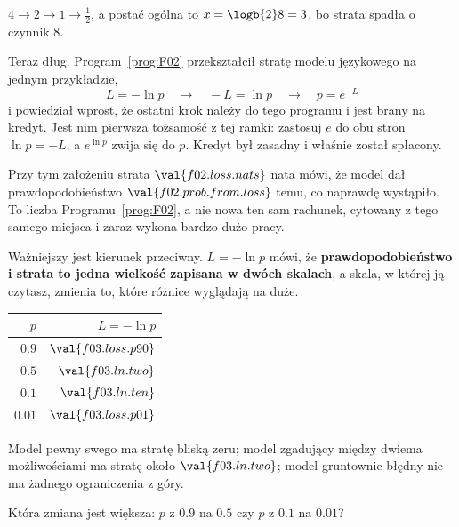 \begin{fr}
$4 \to 2 \to 1 \to \tfrac{1}{2}$, a postać ogólna to $x = \logb{2} 8 = 3$, bo
strata spadła o czynnik $8$.

Teraz dług. Program~\ref{prog:F02} przekształcił stratę modelu językowego na
jednym przykładzie,
\[ L = -\ln p \quad\longrightarrow\quad -L = \ln p
   \quad\longrightarrow\quad p = e^{-L} \]
i powiedział wprost, że ostatni krok należy do tego programu i jest brany na
kredyt. Jest nim pierwsza tożsamość z tej ramki: zastosuj $e$ do obu stron
$\ln p = -L$, a $e^{\ln p}$ zwija się do $p$. Kredyt był zasadny i właśnie
został spłacony.

Przy tym założeniu strata $\val{f02.loss.nats}$ nata mówi, że model dał
prawdopodobieństwo $\val{f02.prob.from.loss}$ temu, co naprawdę wystąpiło. To
liczba Programu~\ref{prog:F02}, a nie nowa \dash{} ten sam rachunek, cytowany z
tego samego miejsca \dash{} i zaraz wykona bardzo dużo pracy.
\end{fr}

\begin{fr}
Ważniejszy jest kierunek przeciwny. $L = -\ln p$ mówi, że
\textbf{prawdopodobieństwo i strata to jedna wielkość zapisana w dwóch
skalach}, a skala, w której ją czytasz, zmienia to, które różnice wyglądają na
duże.

\begin{center}
\begin{tabular}{rr}
\toprule
$p$ & $L = -\ln p$ \\
\midrule
$\num{0.9}$ & $\val{f03.loss.p90}$ \\
$\num{0.5}$ & $\val{f03.ln.two}$ \\
$\num{0.1}$ & $\val{f03.ln.ten}$ \\
$\num{0.01}$ & $\val{f03.loss.p01}$ \\
\bottomrule
\end{tabular}
\end{center}

Model pewny swego ma stratę bliską zeru; model zgadujący między dwiema
możliwościami ma stratę około $\val{f03.ln.two}$; model gruntownie błędny nie
ma żadnego ograniczenia z góry.

Która zmiana jest większa: $p$ z $\num{0.9}$ na $\num{0.5}$ czy $p$ z
$\num{0.1}$ na $\num{0.01}$?
\nextframe
\end{fr}

